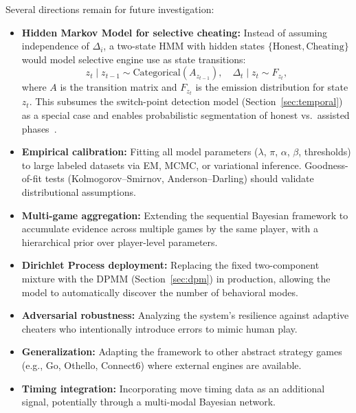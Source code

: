 \documentclass[11pt,a4paper]{article}
\begin{document}
Several directions remain for future investigation:
\begin{itemize}
    \item \textbf{Hidden Markov Model for selective cheating:} Instead of
          assuming independence of $\Delta_i$, a two-state HMM with hidden
          states $\{\text{Honest}, \text{Cheating}\}$ would model selective
          engine use as state transitions:
          \begin{equation}
              z_t \mid z_{t-1} \sim \text{Categorical}(A_{z_{t-1}}),
              \quad \Delta_t \mid z_t \sim F_{z_t},
              \label{eq:hmm}
          \end{equation}
          where $A$ is the transition matrix and $F_{z_t}$ is the emission
          distribution for state $z_t$. This subsumes the switch-point
          detection model (Section~\ref{sec:temporal}) as a special case and
          enables probabilistic segmentation of honest vs.\ assisted
          phases~\citep{rabiner1989tutorial}.
    \item \textbf{Empirical calibration:} Fitting all model parameters
          ($\lambda$, $\pi$, $\alpha$, $\beta$, thresholds) to large
          labeled datasets via EM, MCMC, or variational inference.
          Goodness-of-fit tests (Kolmogorov--Smirnov, Anderson--Darling)
          should validate distributional assumptions.
    \item \textbf{Multi-game aggregation:} Extending the sequential Bayesian
          framework to accumulate evidence across multiple games by the same
          player, with a hierarchical prior over player-level parameters.
    \item \textbf{Dirichlet Process deployment:} Replacing the fixed
          two-component mixture with the DPMM (Section~\ref{sec:dpm}) in
          production, allowing the model to automatically discover the
          number of behavioral modes.
    \item \textbf{Adversarial robustness:} Analyzing the system's resilience
          against adaptive cheaters who intentionally introduce errors to
          mimic human play.
    \item \textbf{Generalization:} Adapting the framework to other abstract
          strategy games (e.g., Go, Othello, Connect6) where external engines
          are available.
    \item \textbf{Timing integration:} Incorporating move timing data as an
          additional signal, potentially through a multi-modal Bayesian
          network.
\end{itemize}
\end{document}
